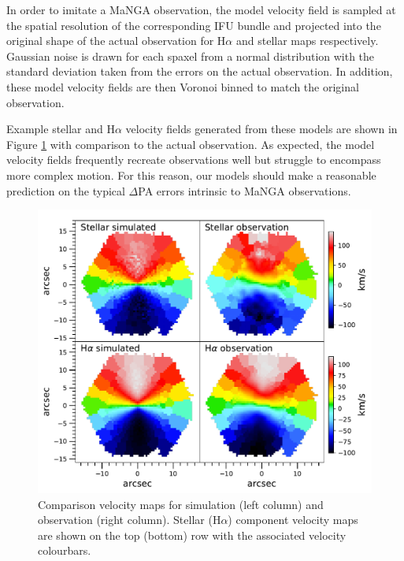 In order to imitate a MaNGA observation, the model velocity field is sampled at the spatial resolution of the corresponding IFU bundle and projected into the original shape of the actual observation for H$\alpha$ and stellar maps respectively. Gaussian noise is drawn for each spaxel from a normal distribution with the standard deviation taken from the errors on the actual observation. In addition, these model velocity fields are then Voronoi binned to match the original observation.

Example stellar and H$\alpha$ velocity fields generated from these models are shown in Figure \ref{fig:sim_ifu} with comparison to the actual observation. As expected, the model velocity fields frequently recreate observations well but struggle to encompass more complex motion. For this reason, our models should make a reasonable prediction on the typical $\Delta$PA errors intrinsic to MaNGA observations.

\begin{figure}
	\includegraphics[width=\linewidth]{thesis/latex/kin_mis_files/obs_sim_IFU.pdf}
    \caption{Comparison velocity maps for simulation (left column) and observation (right column). Stellar (H$\alpha$) component velocity maps are shown on the top (bottom) row with the associated velocity colourbars.}
    \label{fig:sim_ifu}
\end{figure}

